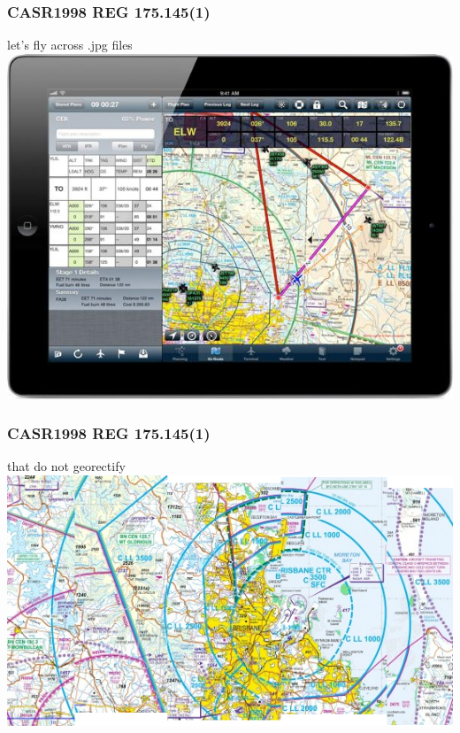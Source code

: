 \begin{frame}
\frametitle{CASR1998 REG 175.145(1)}
\begin{block}{let's fly across .jpg files}
\includegraphics[height=0.5\textheight]{image/avplan-screenshot.jpg}
\end{block}
\end{frame}

\begin{frame}
\frametitle{CASR1998 REG 175.145(1)}
\begin{block}{that do not georectify}
\includegraphics[height=0.5\textheight]{image/vtc-georectification.png}
\end{block}
\end{frame}

